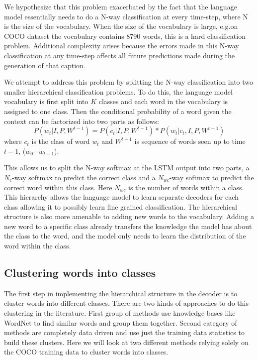 We hypothesize that this problem exacerbated by the fact that the language model
essentially needs to do a N-way classification at every time-step, where N is
the size of the vocabulary.
When the size of the vocabulary is large, e.g.\@ on COCO dataset the vocabulary
contains 8790 words, this is a hard classification problem.
Additional complexity arises because the errors made in this N-way
classification at any time-step affects all future predictions made during the
generation of that caption.

We attempt to address this problem by splitting the N-way classification into
two smaller hierarchical classification problems.
To do this, the language model vocabulary is first split into $K$ classes and
each word in the vocabulary is assigned to one class. 
Then the conditional probability of a word given the context can be factorized
into two parts as follows:
\begin{equation}
  \label{eq:class} 
  P(w_t | I,P, W^{t-1}) = P(c_t| I,P, W^{t-1})*P(w_t | c_t, I,P,W^{t-1})
\end{equation}
\noindent where $c_t$ is the class of word $w_t$ and $W^{t-1}$ is sequence of words
seen up to time $t-1$, ($w_0\cdots w_{t-1}$).

This allows us to split the N-way softmax at the LSTM output into two parts, a
$N_c$-way softmax to predict the correct class and a $N_{wc}$-way softmax to
predict the correct word within this class.
Here $N_{wc}$ is the number of words within a class.
This hierarchy allows the language model to learn separate decoders for each
class allowing it to possibly learn fine grained classification.
The hierarchical structure is also more amenable to adding new words to the
vocabulary.
Adding a new word to a specific class already transfers the knowledge the model
has about the class to the word, and the model only needs to learn the
distribution of the word within the class.

\subsection{Clustering words into classes}
The first step in implementing the hierarchical structure in the decoder is to
cluster words into different classes.
There are two kinds of approaches to do this clustering in the literature.
First group of methods use knowledge bases like WordNet to find similar words
and group them together.
Second category of methods are completely data driven and use just the training
data statistics to build these clusters.
Here we will look at two different methods relying solely on the COCO training
data to cluster words into classes.

